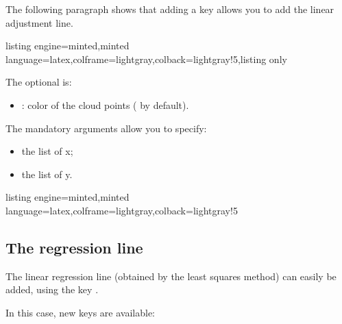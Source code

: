 \documentclass[11pt,a4paper]{ltxdoc}
\begin{document}
\smallskip

The following paragraph shows that adding a key allows you to add the linear adjustment line.

\begin{tcblisting}{listing engine=minted,minted language=latex,colframe=lightgray,colback=lightgray!5,listing only}
\end{tcblisting}

The optional \MontreCode{[key]} is:

\smallskip

\begin{itemize}
	\item {}: color of the cloud points ( by default).
\end{itemize}

\smallskip

The mandatory arguments allow you to specify:

\smallskip

\begin{itemize}
	\item the list of x;
	\item the list of y.
\end{itemize}

\begin{tcblisting}{listing engine=minted,minted language=latex,colframe=lightgray,colback=lightgray!5}
\begin{GraphTikz}%
	[x=0.075cm,y=0.03cm,Xmin=0,Xmax=160,Xgrid=20,Xgrids=10,
	Origy=250,Ymin=250,Ymax=400,Ygrid=25,Ygrids=5]
\end{GraphTikz}
\end{tcblisting}

\subsection{The regression line}\label{reglin}

The linear regression line (obtained by the least squares method) can easily be added, using the key .

\smallskip

In this case, new keys are available:

\smallskip
\end{document}

